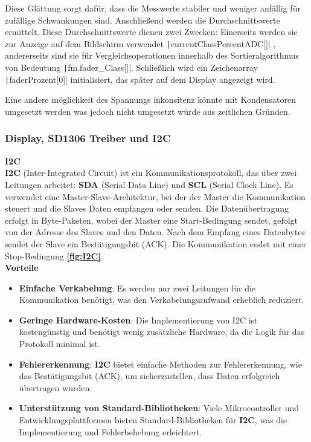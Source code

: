 Diese Glättung sorgt dafür, dass die Messwerte stabiler und weniger anfällig für zufällige Schwankungen sind. Anschließend werden die Durchschnittswerte ermittelt. Diese Durchschnittswerte dienen zwei Zwecken: Einerseits werden sie zur Anzeige auf dem Bildschirm verwendet  \texttt|currentClassPercentADC[]|
, andererseits sind sie für Vergleichsoperationen innerhalb des Sortieralgorithmus von Bedeutung  \texttt|fm.fader_Class[]|.
 Schließlich wird ein Zeichenarray \texttt|faderProzent[0]| initialisiert, das später auf dem Display angezeigt wird. 
 
Eine andere möglichkeit des Spannungs inkonsitenz könnte mit Kondensatoren umgesetzt werden was jedoch nicht umgesetzt würde aus zeitlichen Gründen.

\newpage
\subsubsection{Display, SD1306 Treiber und I2C}

\textbf{I2C} \\

\textbf{I2C} (Inter-Integrated Circuit) ist ein Kommunikationsprotokoll, das über zwei Leitungen arbeitet: \textbf{SDA} (Serial Data Line) und \textbf{SCL} (Serial Clock Line). Es verwendet eine Master-Slave-Architektur, bei der der Master die Kommunikation steuert und die Slaves Daten empfangen oder senden. Die Datenübertragung erfolgt in Byte-Paketen, wobei der Master eine Start-Bedingung sendet, gefolgt von der Adresse des Slaves und den Daten. Nach dem Empfang eines Datenbytes sendet der Slave ein Bestätigungsbit (ACK). Die Kommunikation endet mit einer Stop-Bedingung \textbf{\autoref{fig:I2C}}. \\

\textbf{Vorteile}\\

\begin{itemize}
	\item \textbf{Einfache Verkabelung}: Es werden nur zwei Leitungen für die Kommunikation benötigt, was den Verkabelungsaufwand erheblich reduziert.
	\item \textbf{Geringe Hardware-Kosten}: Die Implementierung von I2C ist kostengünstig und benötigt wenig zusätzliche Hardware, da die Logik für das Protokoll minimal ist.
	\item \textbf{Fehlererkennung}: \textbf{I2C} bietet einfache Methoden zur Fehlererkennung, wie das Bestätigungsbit (ACK), um sicherzustellen, dass Daten erfolgreich übertragen wurden.
	\item \textbf{Unterstützung von Standard-Bibliotheken}: Viele Mikrocontroller und Entwicklungsplattformen bieten Standard-Bibliotheken für \textbf{I2C}, was die Implementierung und Fehlerbehebung erleichtert.
\end{itemize}

